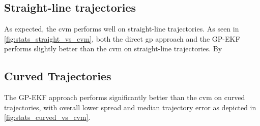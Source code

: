 \subsection{Straight-line trajectories}
As expected, the \acrshort{cvm} performs well on straight-line trajectories. As seen in \cref{fig:stats_straight_vs_cvm}, both the direct \acrshort{gp} approach and the GP-EKF performs slightly better than the \acrshort{cvm} on straight-line trajectories. By

\subsection{Curved Trajectories}
The GP-EKF approach performs significantly better than the \acrshort{cvm} on curved trajectories, with overall lower spread and median trajectory error as depicted in \cref{fig:stats_curved_vs_cvm}.

